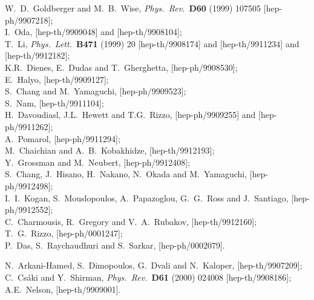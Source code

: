 \documentclass[a4paper,12pt]{article}
\begin{document}
\begin{thebibliography}{99}
W.~D.~Goldberger and M.~B.~Wise,
{\it Phys.\ Rev.}\  {\bf D60} (1999) 107505
[hep-ph/9907218];\\
%
I.~Oda,
[hep-th/9909048]
and
[hep-th/9908104];\\
%
T.~Li,
{\it Phys.\ Lett.}\  {\bf B471} (1999) 20
[hep-th/9908174]
and
[hep-th/9911234]
and
[hep-th/9912182];\\
%
K.R.~Dienes, E.~Dudas and T.~Gherghetta,
[hep-ph/9908530];\\
%
E.~Halyo,
[hep-th/9909127];\\
%
S.~Chang and M.~Yamaguchi,
[hep-ph/9909523];\\
%
S.~Nam,
[hep-th/9911104];\\
%
H.~Davoudiasl, J.L.~Hewett and T.G.~Rizzo,
[hep-ph/9909255]
and
[hep-ph/9911262];\\
%
A.~Pomarol,
[hep-ph/9911294];\\
%
M.~Chaichian and A.~B.~Kobakhidze,
[hep-th/9912193];\\
%
Y.~Grossman and M.~Neubert,
[hep-ph/9912408];\\
%
S.~Chang, J.~Hisano, H.~Nakano, N.~Okada and M.~Yamaguchi,
[hep-ph/9912498];\\
%
I.~I.~Kogan, S.~Mouslopoulos, A.~Papazoglou, G.~G.~Ross and J.~Santiago,
[hep-ph/9912552];\\
%
C.~Charmousis, R.~Gregory and V.~A.~Rubakov,
[hep-th/9912160];\\
%
T.~G.~Rizzo,
[hep-ph/0001247];\\
%
P.~Das, S.~Raychaudhuri and S.~Sarkar,
[hep-ph/0002079].




N.~Arkani-Hamed, S.~Dimopoulos, G.~Dvali and N.~Kaloper,
[hep-th/9907209];\\
%
C.~Cs\'aki and Y.~Shirman,
{\it Phys.\ Rev.}\  {\bf D61} (2000) 024008
[hep-th/9908186];\\
%
A.E.~Nelson,
[hep-th/9909001].




\end{thebibliography}
\end{document}
